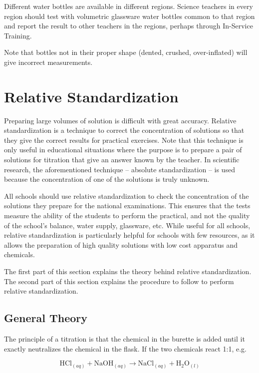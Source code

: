 Different water bottles are available in different regions. Science teachers in every region should test with volumetric glassware water bottles common to that region and report the result to other teachers in the regions, perhaps through In-Service Training.

Note that bottles not in their proper shape (dented, crushed, over-inflated) will give incorrect measurements.

\section{Relative Standardization}

Preparing large volumes of solution is difficult with great accuracy. Relative standardization is a technique to correct the concentration of solutions so that they give the correct results for practical exercises. Note that this technique is only useful in educational situations where the purpose is to prepare a pair of solutions for titration that give an answer known by the teacher. In scientific research, the aforementioned technique -- absolute standardization -- is used because the concentration of one of the solutions is truly unknown.

All schools should use relative standardization to check the concentration of the solutions they prepare for the national examinations. This ensures that the tests measure the ability of the students to perform the practical, and not the quality of the school's balance, water supply, glassware, etc. While useful for all schools, relative standardization is particularly helpful for schools with few resources, as it allows the preparation of high quality solutions with low cost apparatus and chemicals.

The first part of this section explains the theory behind relative standardization. The second part of this section explains the procedure to follow to perform relative standardization.

\subsection{General Theory}

The principle of a titration is that the chemical in the burette is added until it exactly neutralizes the chemical in the flask. If the two chemicals react 1:1, e.g. 

\[ \mathrm{HCl}_{(aq)} + \mathrm{NaOH}_{(aq)} \longrightarrow \mathrm{NaCl}_{(aq)} + \mathrm{H}_{2}\mathrm{O}_{(l)} \]

